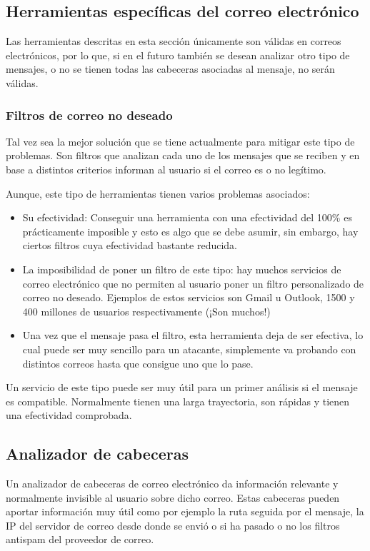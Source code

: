 \subsection{Herramientas específicas del correo electrónico}
Las herramientas descritas en esta sección únicamente son válidas en correos electrónicos, por lo que, si en el futuro también se desean analizar otro tipo de mensajes, o no se tienen todas las cabeceras asociadas al mensaje, no serán válidas.

\subsubsection{Filtros de correo no deseado}
Tal vez sea la mejor solución que se tiene actualmente para mitigar este tipo de problemas. Son filtros que analizan cada uno de los mensajes que se reciben y en base a distintos criterios informan al usuario si el correo es o no legítimo.

Aunque, este tipo de herramientas tienen varios problemas asociados:

\begin{itemize}
    \item Su efectividad: Conseguir una herramienta con una efectividad del 100\% es prácticamente imposible y esto es algo que se debe asumir, sin embargo, hay ciertos filtros cuya efectividad bastante reducida.
    \item La imposibilidad de poner un filtro de este tipo: hay muchos servicios de correo electrónico que no permiten al usuario poner un filtro personalizado de correo no deseado. Ejemplos de estos servicios son Gmail u Outlook,  1500 \cite{usuarios_gmail} y 400 \cite{usuarios_hotmail} millones de usuarios respectivamente (¡Son muchos!)
    \item Una vez que el mensaje pasa el filtro, esta herramienta deja de ser efectiva, lo cual puede ser muy sencillo para un atacante, simplemente va probando con distintos correos hasta que consigue uno que lo pase. 
\end{itemize}

Un servicio de este tipo puede ser muy útil para un primer análisis si el mensaje es compatible. Normalmente tienen una larga trayectoria, son rápidas y tienen una efectividad comprobada.

\subsection{Analizador de cabeceras}
Un analizador de cabeceras de correo electrónico da información relevante y normalmente invisible al usuario sobre dicho correo. Estas cabeceras pueden aportar información muy útil como por ejemplo la ruta seguida por el mensaje, la IP del servidor de correo desde donde se envió o si ha pasado o no los filtros antispam del proveedor de correo. 

